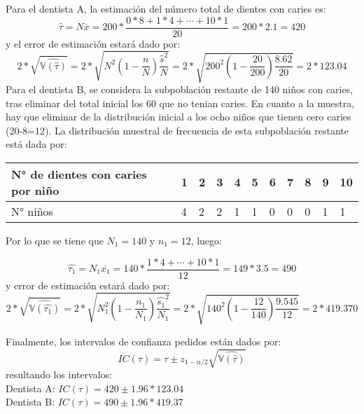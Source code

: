 \begin{solution}
Para el dentista A, la estimación del número total de dientes con caries es:
$$\hat{\tau}=N\overline{x}=200*\dfrac{0*8+1*4+\cdots+10*1}{20}=200*2.1=420$$
y el error de estimación estará dado por:
$$2*\sqrt{\widehat{\mathbb{V}(\hat{\tau})}}=2*\sqrt{N^2\left(1-\dfrac{n}{N}\right)\dfrac{\hat{s}^2}{N}}=2*\sqrt{200^2\left(1-\dfrac{20}{200}\right)\dfrac{8.62}{20}}=2*123.04$$
Para el dentista B, se considera la subpoblación restante de 140 niños con caries, tras eliminar del total inicial los 60 que no tenian caries. En cuanto a la muestra, hay que eliminar de la distribución inicial a los ocho niños que tienen cero caries (20-8=12). La distribución muestral de frecuencia de esta subpoblación restante está dada por:



\begin{center}
\begin{tabular}{lllllllllll}
N° de dientes con caries por niño & 1 & 2 & 3 & 4 & 5 & 6 & 7 & 8 & 9 & 10 \\ \hline
N° niños                          & 4 & 2 & 2 & 1 & 1 & 0 & 0 & 0 & 1 & 1 
\end{tabular}
\end{center}

Por lo que se tiene que $N_1=140$ y $n_1=12$, luego:

$$\hat{\tau_1}=N_1\overline{x_1}=140*\dfrac{1*4+\cdots+10*1}{12}=149*3.5=490$$
y error de estimación estará dado por:
$$2*\sqrt{\widehat{\mathbb{V}(\hat{\tau_1})}}=2*\sqrt{N_{1}^{2}\left(1-\dfrac{n_1}{N_1}\right)\dfrac{\hat{s_1}^2}{N_1}}=2*\sqrt{140^2\left(1-\dfrac{12}{140}\right)\dfrac{9.545}{12}}=2*419.370$$

Finalmente, los intervalos de confianza pedidos están dados por:
$$IC(\tau)=\hat{\tau}\pm z_{1-\alpha/2} \sqrt{\widehat{\mathbb{V}(\hat{\tau})}}$$
resultando los intervalos:\\
Dentista A: $IC(\tau)=420 \pm 1.96 * 123.04$\\
Dentista B: $IC(\tau)=490 \pm 1.96 * 419.37$
\end{solution}

